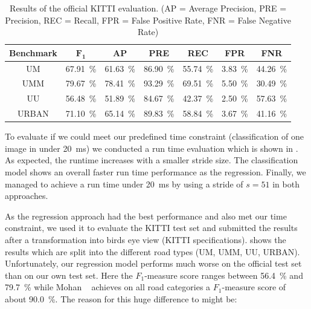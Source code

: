 \begin{table}[]
    \begin{center}
    \begin{tabular}{c|cccccc}
        \toprule
        {\bf Benchmark} & {\bf $\mathbf{F_1}$} & {\bf AP} & {\bf PRE} & {\bf REC} & {\bf FPR} & {\bf FNR}\\
        \midrule
        UM    & \SI{67.91}{\percent} & \SI{61.63}{\percent} & \SI{86.90}{\percent} & \SI{55.74}{\percent} & \SI{3.83}{\percent} & \SI{44.26}{\percent}\\
        UMM   & \SI{79.67}{\percent} & \SI{78.41}{\percent} & \SI{93.29}{\percent} & \SI{69.51}{\percent} & \SI{5.50}{\percent} & \SI{30.49}{\percent}\\
        UU    & \SI{56.48}{\percent} & \SI{51.89}{\percent} & \SI{84.67}{\percent} & \SI{42.37}{\percent} & \SI{2.50}{\percent} & \SI{57.63}{\percent}\\
        URBAN & \SI{71.10}{\percent} & \SI{65.14}{\percent} & \SI{89.83}{\percent} & \SI{58.84}{\percent} & \SI{3.67}{\percent} & \SI{41.16}{\percent}\\
        \bottomrule
        \end{tabular}
    \end{center}
    \caption{Results of the official KITTI evaluation. (AP = Average Precision, PRE = Precision, REC = Recall, FPR = False Positive Rate, FNR = False Negative Rate)}
    \label{tab:kitti}
\end{table}

To evaluate if we could meet our predefined time constraint (classification of
one image in under \SI{20}{\milli\second}) we conducted a run time evaluation
which is shown in . As expected, the runtime increases with a
smaller stride size. The classification model shows an overall faster run time
performance as the regression. Finally, we managed to achieve a run time under
\SI{20}{\milli\second} by using a stride of $s=51$ in both approaches.

As the regression approach had the best performance and also met our time
constraint, we used it to evaluate the KITTI test set and submitted the results
after a transformation into birds eye view (KITTI
specifications). shows the results which are split into the
different road types (UM, UMM, UU, URBAN).
Unfortunately, our regression model performs much worse on the official test
set than on our own test set. Here the $F_1$-measure score ranges between
\SI{56.4}{\percent} and \SI{79.7}{\percent} while Mohan ~\cite{Tarel2009}
achieves on all road categories a $F_1$-measure score of about
\SI{90.0}{\percent}. The reason for this huge difference to might be: \\

